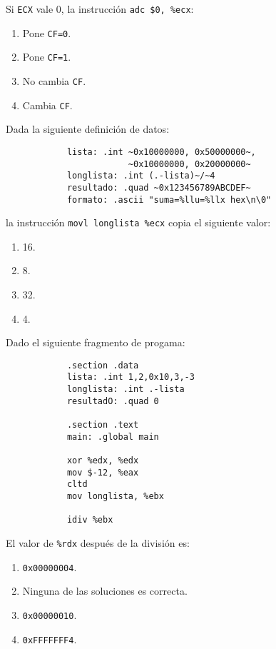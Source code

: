 \documentclass[12pt]{article}
\begin{document}
    \begin{ejercicio}
        Si \verb|ECX| vale 0, la instrucción \verb|adc $0, %ecx|:
        \begin{enumerate}[label=\alph*)]
            \item Pone \verb|CF=0|.
            \item Pone \verb|CF=1|.
            \item No cambia \verb|CF|.
            \item Cambia \verb|CF|.
        \end{enumerate}
    \end{ejercicio}
    \begin{ejercicio}
        Dada la siguiente definición de datos:
        \begin{verbatim}
            lista: .int ~0x10000000, 0x50000000~,
                        ~0x10000000, 0x20000000~
            longlista: .int (.-lista)~/~4
            resultado: .quad ~0x123456789ABCDEF~
            formato: .ascii "suma=%llu=%llx hex\n\0"
        \end{verbatim}
        la instrucción \verb|movl longlista %ecx| copia el siguiente valor:
        \begin{enumerate}[label=\alph*)]
            \item 16.
            \item 8.
            \item 32.
            \item 4.
        \end{enumerate}
    \end{ejercicio}
    \begin{ejercicio}
        Dado el siguiente fragmento de progama:
        \begin{verbatim}
            .section .data
            lista: .int 1,2,0x10,3,-3
            longlista: .int .-lista
            resultadO: .quad 0

            .section .text
            main: .global main

            xor %edx, %edx
            mov $-12, %eax
            cltd
            mov longlista, %ebx

            idiv %ebx
        \end{verbatim}
        El valor de \verb|%rdx| después de la división es:
        \begin{enumerate}[label=\alph*)]
            \item \verb|0x00000004|.
            \item Ninguna de las soluciones es correcta.
            \item \verb|0x00000010|.
            \item \verb|0xFFFFFFF4|.
        \end{enumerate}
    \end{ejercicio}
\end{document}
